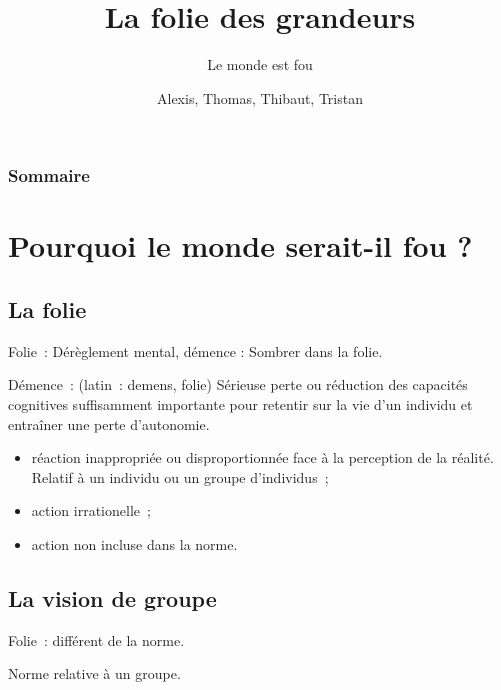 \documentclass{beamer}
\title{La folie des grandeurs}
\subtitle{Le monde est fou}
\author{Alexis, Thomas, Thibaut, Tristan}
\begin{document}
\begin{frame}
  \titlepage
\end{frame}

\begin{frame}
    \frametitle{Sommaire}
    \begin{multicols}{2}
      {
		\setcounter{tocdepth}{1}
        \tableofcontents
      }
    \end{multicols}
\end{frame}

\section{Pourquoi le monde serait-il fou ?}

\subsection{La folie}

\begin{frame}
  \begin{displayquote}
    Folie~: Dérèglement mental, démence : Sombrer dans la folie.

    Démence~: (latin~: demens, folie) Sérieuse perte ou réduction des capacités cognitives suffisamment importante pour retentir sur la vie d'un individu et entraîner une perte d'autonomie.
  \end{displayquote}
\end{frame}

\begin{frame}
	\begin{itemize}
		\item réaction inappropriée ou disproportionnée face à la perception de la réalité. Relatif à un individu ou un groupe d'individus~;
		\item action irrationelle~;
		\item action non incluse dans la norme.
	\end{itemize}
\end{frame}


\subsection{La vision de groupe}

\begin{frame}
	Folie~: différent de la norme.
	
	Norme relative à un groupe.
\end{frame}
\end{document}
